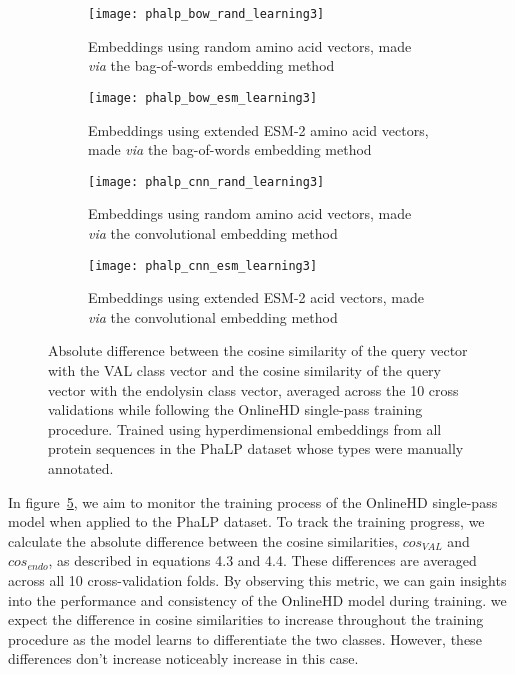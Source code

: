 \begin{figure}[h!]
    \centering
    \begin{subfigure}{0.48\textwidth}
        \texttt{[image: phalp\_bow\_rand\_learning3]}
        \caption{Embeddings using random amino acid vectors, made \textit{via} the bag-of-words embedding method}
        \label{fig:subfig-a2}
    \end{subfigure}
    \hfill
    \begin{subfigure}{0.48\textwidth}
        \texttt{[image: phalp\_bow\_esm\_learning3]}
        \caption{Embeddings using extended ESM-2 amino acid vectors, made \textit{via} the bag-of-words embedding method}
        \label{fig:subfig-b2}
    \end{subfigure}
    
    \begin{subfigure}{0.48\textwidth}
        \texttt{[image: phalp\_cnn\_rand\_learning3]}
        \caption{Embeddings using random amino acid vectors, made \textit{via} the convolutional embedding method}
        \label{fig:subfig-c2}
    \end{subfigure}
    \hfill
    \begin{subfigure}{0.48\textwidth}
        \texttt{[image: phalp\_cnn\_esm\_learning3]}
        \caption{Embeddings using extended ESM-2 acid vectors, made \textit{via} the convolutional embedding method}
        \label{fig:subfig-d2}
    \end{subfigure}
    \caption{Absolute difference between the cosine similarity of the query vector with the VAL class vector and the cosine similarity of the query vector with the endolysin class vector, averaged across the 10 cross validations while following the OnlineHD single-pass training procedure. Trained using hyperdimensional embeddings from all protein sequences in the PhaLP dataset whose types were manually annotated.}
    \label{fig:main2}
\end{figure}

In figure~\ref{fig:main2}, we aim to monitor the training process of the OnlineHD single-pass model when applied to the PhaLP dataset. To track the training progress, we calculate the absolute difference between the cosine similarities, $cos_{VAL}$ and $cos_{endo}$, as described in equations 4.3 and 4.4. These differences are averaged across all 10 cross-validation folds. By observing this metric, we can gain insights into the performance and consistency of the OnlineHD model during training. we expect the difference in cosine similarities to increase throughout the training procedure as the model learns to differentiate the two classes. However, these differences don't increase noticeably increase in this case.

